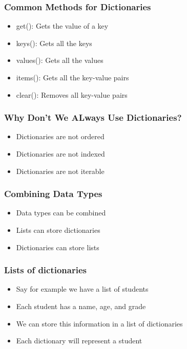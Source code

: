 \documentclass[serif, 9pt, aspectratio=32]{beamer}
\begin{document}
\begin{frame}
    \centering
    \frametitle{Common Methods for Dictionaries}
    \begin{itemize}
        \setlength{\itemsep}{3em}
        \item get(): Gets the value of a key
        \item keys(): Gets all the keys
        \item values(): Gets all the values
        \item items(): Gets all the key-value pairs
        \item clear(): Removes all key-value pairs
    \end{itemize}
\end{frame}

\begin{frame}
    \centering
    \frametitle{Why Don't We ALways Use Dictionaries?}
    \begin{itemize}
        \setlength{\itemsep}{3em}
        \item Dictionaries are not ordered
        \item Dictionaries are not indexed
        \item Dictionaries are not iterable
    \end{itemize}
\end{frame}

\begin{frame}
    \centering
    \frametitle{Combining Data Types}
    \begin{itemize}
        \setlength{\itemsep}{3em}
        \item Data types can be combined
        \item Lists can store dictionaries
        \item Dictionaries can store lists
    \end{itemize}
\end{frame}

\begin{frame}
    \centering
    \frametitle{Lists of dictionaries}
    \begin{itemize}
        \setlength{\itemsep}{3em}
        \item Say for example we have a list of students
        \item Each student has a name, age, and grade
        \item We can store this information in a list of dictionaries
        \item Each dictionary will represent a student
    \end{itemize}
\end{frame}
\end{document}
